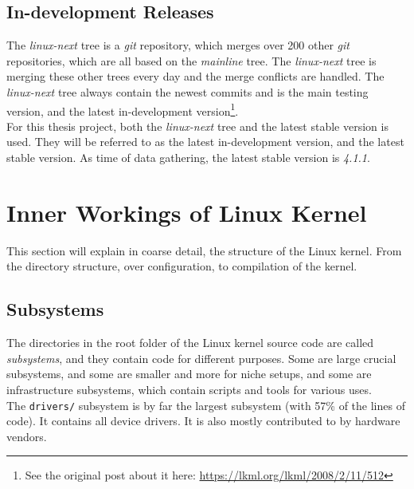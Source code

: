 \documentclass[a4paper,11pt]{report}
\newcommand{\f}{\footnote{\fn}}
\newcommand{\figa}{
    \begin{figure}[!htpb]
    \centering
}
\newcommand{\figb}[2]{
    \caption{#1}
    \label{#2}
    \end{figure}
}
\begin{document}
        \subsection*{In-development Releases}

        \def \fn {See the original post about it here: 
        \url{https://lkml.org/lkml/2008/2/11/512}}
The \emph{linux-next} tree is a \emph{git} repository, which 
merges over 200 other \emph{git} repositories\cite
    {nextTrees},
which are all based on the \emph{mainline} tree. The \emph{linux-next} tree is 
merging these other trees every day and the merge conflicts are handled. 
The \emph{linux-next} tree always contain the newest commits and is the main 
testing version, and the latest in-development version\f.
\\

For this thesis project, both the \emph{linux-next} tree and the latest stable 
version is used. They will be referred to as the latest in-development version, 
and the latest stable version. As time of data gathering, the latest stable 
version is \emph{4.1.1}.


    \section{Inner Workings of Linux Kernel}

This section will explain in coarse detail, the structure of the Linux kernel.
From the directory structure, over configuration, to compilation of the kernel.


        \subsection{Subsystems}

The directories in the root folder of the Linux kernel source code are called 
\emph{subsystems}, and they contain code for different purposes. Some are large 
crucial subsystems, and some are smaller and more for niche setups, and some 
are infrastructure subsystems\cite{42bugs}, which contain scripts and tools for
various uses.
\\

The \texttt{drivers/} subsystem is by far the largest subsystem (with 57\% of 
the lines of code). It contains all device drivers. It is also mostly 
contributed to by hardware vendors.
\end{document}
